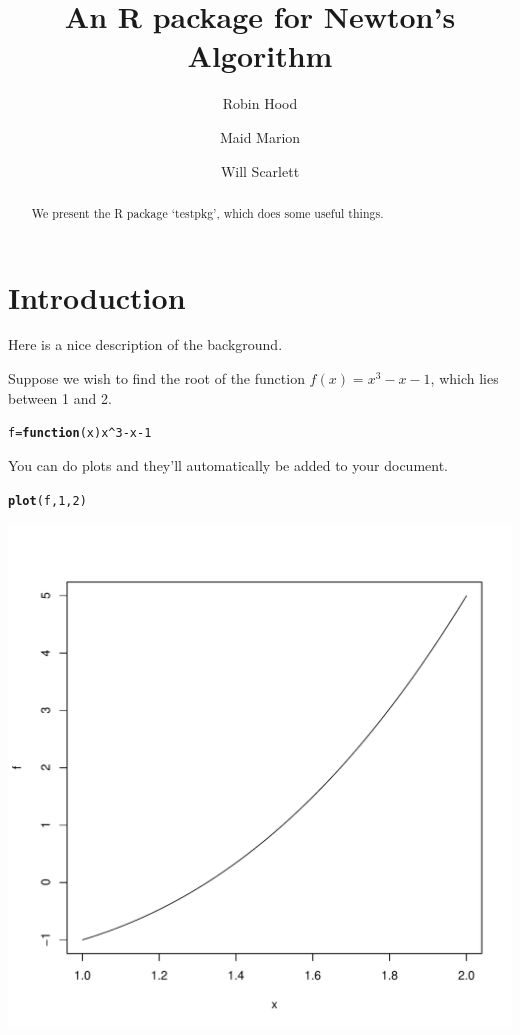 \documentclass{article}\usepackage[]{graphicx}\usepackage[]{color}
\title{An R package for Newton's Algorithm}
\author{Robin Hood \and Maid Marion \and Will Scarlett}
\makeatletter
\def\maxwidth{ %
  \ifdim\Gin@nat@width>\linewidth
    \linewidth
  \else
    \Gin@nat@width
  \fi
}
\newcommand{\hlnum}[1]{\textcolor[rgb]{0.686,0.059,0.569}{#1}}%
\newcommand{\hlopt}[1]{\textcolor[rgb]{0,0,0}{#1}}%
\newcommand{\hlstd}[1]{\textcolor[rgb]{0.345,0.345,0.345}{#1}}%
\newcommand{\hlkwa}[1]{\textcolor[rgb]{0.161,0.373,0.58}{\textbf{#1}}}%
\newcommand{\hlkwb}[1]{\textcolor[rgb]{0.69,0.353,0.396}{#1}}%
\newcommand{\hlkwc}[1]{\textcolor[rgb]{0.333,0.667,0.333}{#1}}%
\newcommand{\hlkwd}[1]{\textcolor[rgb]{0.737,0.353,0.396}{\textbf{#1}}}%
\newenvironment{kframe}{%
 \def\at@end@of@kframe{}%
 \ifinner\ifhmode%
  \def\at@end@of@kframe{\end{minipage}}%
  \begin{minipage}{\columnwidth}%
 \fi\fi%
 \def\FrameCommand##1{\hskip\@totalleftmargin \hskip-\fboxsep
 \colorbox{shadecolor}{##1}\hskip-\fboxsep
     \hskip-\linewidth \hskip-\@totalleftmargin \hskip\columnwidth}%
 \MakeFramed {\advance\hsize-\width
   \@totalleftmargin\z@ \linewidth\hsize
   \@setminipage}}%
 {\par\unskip\endMakeFramed%
 \at@end@of@kframe}
\newenvironment{knitrout}{}{} %
\makeatother
\begin{document}

\maketitle

\begin{abstract}
We present the R package `testpkg', which does some useful things.
\end{abstract}

\section{Introduction}

Here is a nice description of the background.

Suppose we wish to find the root of the function $f(x) = x^3 - x - 1$, which lies
between 1 and 2.
\begin{knitrout}
\color{fgcolor}\begin{kframe}
\begin{alltt}
\hlstd{f} \hlkwb{=} \hlkwa{function}\hlstd{(}\hlkwc{x}\hlstd{) x}\hlopt{^}\hlnum{3} \hlopt{-} \hlstd{x} \hlopt{-} \hlnum{1}
\end{alltt}
\end{kframe}
\end{knitrout}
You can do plots and they'll automatically be added to your document.
\begin{knitrout}
\color{fgcolor}\begin{kframe}
\begin{alltt}
\hlkwd{plot}\hlstd{(f,} \hlnum{1}\hlstd{,} \hlnum{2}\hlstd{)}
\end{alltt}
\end{kframe}
\includegraphics[width=\maxwidth]{figure/chunkname2-1} 

\end{knitrout}
\end{document}
